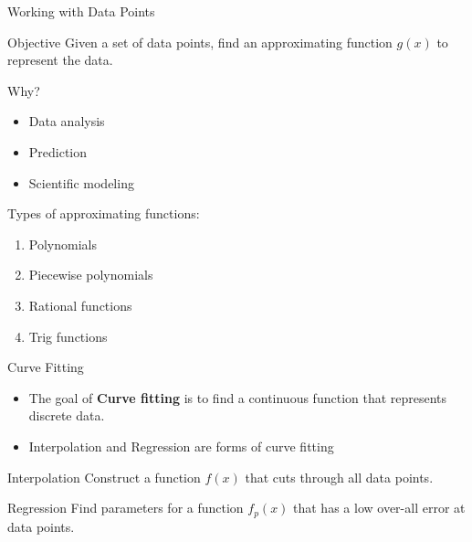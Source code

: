 \documentclass[10pt]{beamer}
\begin{document}
\begin{frame}{Working with Data Points}
  \begin{block}{Objective}
  Given a set of data points, find an approximating function $g(x)$ to represent the data.  
  \end{block}
\vspace{5mm}
Why?\\
\begin{itemize}
    \item Data analysis 
    \item Prediction 
    \item Scientific modeling 
\end{itemize}
\vspace{5mm}
Types of approximating functions:
\begin{enumerate}
  \item Polynomials
  \item Piecewise polynomials
  \item Rational functions
  \item Trig functions
\end{enumerate}
\end{frame}
\begin{frame}{Curve Fitting}


\begin{itemize}
    \item  The goal of \textbf{Curve fitting} is to find a continuous function that represents discrete data.

    \item Interpolation and Regression are forms of curve fitting
    
\end{itemize}
\vfill
\begin{block}{Interpolation}
    Construct a function $f(x)$ that cuts through all data points. 
\end{block}
\vfill 
\begin{block}{Regression}
    Find parameters for a function $f_p(x)$ that has a low over-all error at data points.
\end{block}
\vfill

\end{frame}
\end{document}

